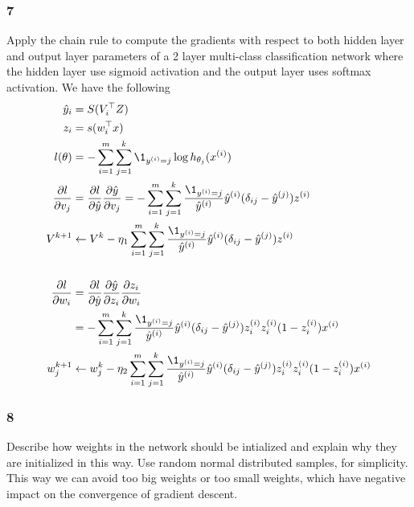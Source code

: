 \documentclass{article}
\begin{document}
\subsubsection*{7}
\begin{myleftlinebox}
    Apply the chain rule to compute the gradients with respect to both hidden layer and output layer parameters of a 2 layer multi-class classification network where the hidden layer use sigmoid activation and the output layer uses softmax activation.
    \tcbline
    We have the following
    \begin{equation*}
        \begin{split}
            \hat y_i &= S(V_i^\top Z)\\
            z_i &= s(w_i^\top x)\\
            l(\theta) &= -\sum_{i=1}^m\sum_{j=1}^k \1_{y^{(i)}=j} \log h_{\theta_j}(x^{(i)})\\
            \frac{\partial l}{\partial v_j} &= \frac{\partial l}{\partial \hat y}\frac{\partial \hat y}{\partial v_j} =  -\sum_{i=1}^m\sum_{j=1}^k  \frac{\1_{y^{(i)}=j}}{\hat y^{(i)}}  \hat y^{(i)} (\delta_{ij}-\hat y^{(j)})z^{(i)}\\
            V^{k+1} &\gets V^{k}-\eta_1 \sum_{i=1}^m\sum_{j=1}^k  \frac{\1_{y^{(i)}=j}}{\hat y^{(i)}}  \hat y^{(i)} (\delta_{ij}-\hat y^{(j)})z^{(i)}\\\\
            \frac{\partial l}{\partial w_i} &= \frac{\partial l}{\partial \hat y}\frac{\partial\hat y}{\partial z_i}\frac{\partial z_i}{\partial w_i}\\
            &=- \sum_{i=1}^m\sum_{j=1}^k  \frac{\1_{y^{(i)}=j}}{\hat y^{(i)}}  \hat y^{(i)} (\delta_{ij}-\hat y^{(j)}) z^{(i)}_i z^{(i)}_i(1-z^{(i)}_i)x^{(i)}\\
            w_j^{k+1} &\gets w_j^k-\eta_2  \sum_{i=1}^m\sum_{j=1}^k  \frac{\1_{y^{(i)}=j}}{\hat y^{(i)}}  \hat y^{(i)} (\delta_{ij}-\hat y^{(j)}) z^{(i)}_i z^{(i)}_i(1-z^{(i)}_i)x^{(i)}
        \end{split}    
    \end{equation*}
\end{myleftlinebox}

\subsubsection*{8}
\begin{myleftlinebox}
    Describe how weights in the network should be intialized and explain why they are initialized in this way.
    \tcblower
    Use random normal distributed samples, for simplicity. This way we can avoid too big weights or too small weights, which have negative impact on the convergence of gradient descent.
\end{myleftlinebox}
\end{document}
